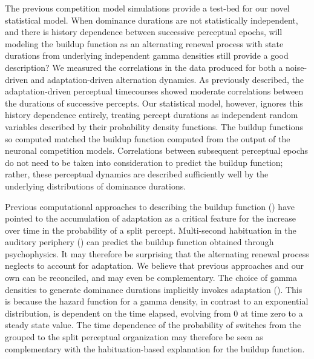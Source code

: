 The previous competition model simulations provide a test-bed for our novel statistical model. When dominance durations are not statistically independent, and there is history dependence between successive perceptual epochs, will modeling the buildup function as an alternating renewal process with state durations from underlying independent gamma densities still provide a good description? We measured the correlations in the data produced for both a noise-driven and adaptation-driven alternation dynamics. As previously described, the adaptation-driven perceptual timecourses showed moderate correlations between the durations of successive percepts. Our statistical model, however, ignores this history dependence entirely, treating percept durations as independent random variables described by their probability density functions. The buildup functions so computed matched the buildup function computed from the output of the neuronal competition models. Correlations between subsequent perceptual epochs do not need to be taken into consideration to predict the buildup function; rather, these perceptual dynamics are described sufficiently well by the underlying distributions of dominance durations.

Previous computational approaches to describing the buildup function (\cite{Micheyl2005, Pressnitzer2008}) have pointed to the accumulation of adaptation as a critical feature for the increase over time in the probability of a split percept. Multi-second habituation in the auditory periphery (\cite{Pressnitzer2008}) can predict the buildup function obtained through psychophysics. It may therefore be surprising that the alternating renewal process neglects to account for adaptation. We believe that previous approaches and our own can be reconciled, and may even be complementary. The choice of gamma densities to generate dominance durations implicitly invokes adaptation (\cite{Wilbur1982}). This is because the hazard function for a gamma density, in contrast to an exponential distribution, is dependent on the time elapsed, evolving from 0 at time zero to a steady state value. The time dependence of the probability of switches from the grouped to the split perceptual organization may therefore be seen as complementary with the habituation-based explanation for the buildup function. 

